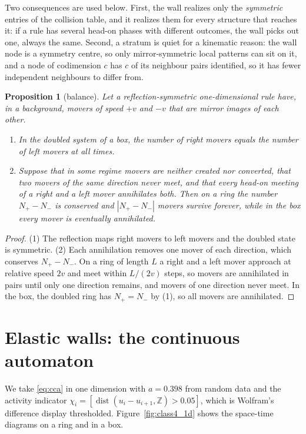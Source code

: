 \documentclass[11pt,a4paper]{article}
\newtheorem{proposition}[theorem]{Proposition}
\theoremstyle{definition}
\theoremstyle{remark}
\newcommand{\Z}{\mathbb{Z}}
\DeclareMathOperator{\dist}{dist}
\begin{document}
Two consequences are used below. First, the wall realizes only the
\emph{symmetric} entries of the collision table, and it realizes them
for every structure that reaches it: if a rule has several head-on
phases with different outcomes, the wall picks out one, always the same.
Second, a stratum is quiet for a kinematic reason: the wall node is a
symmetry centre, so only mirror-symmetric local patterns can sit on it,
and a node of codimension $c$ has $c$ of its neighbour pairs identified,
so it has fewer independent neighbours to differ from.

\begin{proposition}[balance]\label{prop:balance}
Let a reflection-symmetric one-dimensional rule have, in a background,
movers of speed $+v$ and $-v$ that are mirror images of each other.
\begin{enumerate}
\item In the doubled system of a box, the number of right movers equals the number of left movers at all times.
\item Suppose that in some regime movers are neither created nor converted, that two movers of the same direction never meet, and that every head-on meeting of a right and a left mover annihilates both. Then on a ring the number $N_+-N_-$ is conserved and $|N_+-N_-|$ movers survive forever, while in the box every mover is eventually annihilated.
\end{enumerate}
\end{proposition}

\begin{proof}
(1) The reflection maps right movers to left movers and the doubled
state is symmetric. (2) Each annihilation removes one mover of each
direction, which conserves $N_+-N_-$. On a ring of length $L$ a right and
a left mover approach at relative speed $2v$ and meet within $L/(2v)$
steps, so movers are annihilated in pairs until only one direction
remains, and movers of one direction never meet. In the box, the
doubled ring has $N_+=N_-$ by (1), so all movers are annihilated.
\end{proof}

\section{Elastic walls: the continuous automaton}\label{sec:cca}

We take \eqref{eq:cca} in one dimension with $a=0.398$ from random data
and the activity indicator
$\chi_i=[\dist(u_i-u_{i+1},\Z)>0.05]$, which is Wolfram's difference
display thresholded. Figure~\ref{fig:class4_1d} shows the space-time
diagrams on a ring and in a box.
\end{document}
